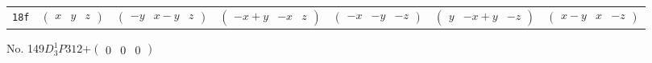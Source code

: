 \documentclass[fleqn,9pt,landscape]{jsarticle}
\begin{document}
\begin{center}
\begin{longtable}{ccccccc}
{\tt 18f} & $ \begin{pmatrix} x & y & z \end{pmatrix} $ & $ \begin{pmatrix} - y & x - y & z \end{pmatrix} $ & $ \begin{pmatrix} - x + y & - x & z \end{pmatrix} $ & $ \begin{pmatrix} - x & - y & - z \end{pmatrix} $ & $ \begin{pmatrix} y & - x + y & - z \end{pmatrix} $ & $ \begin{pmatrix} x - y & x & - z \end{pmatrix} $ \\
\end{longtable}
\end{center}
\newpage
No. 149\quad$D_{3}^{1}$\quad$P312$\quad[ trigonal ]\quad$+\begin{pmatrix} 0 & 0 & 0 \end{pmatrix}$
\end{document}
